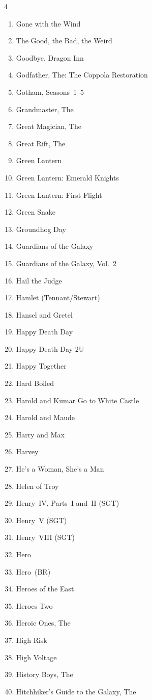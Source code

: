 \documentclass{article}
\begin{document}
\begin{multicols}{4}
\begin{enumerate}
\item Gone with the Wind
\item The Good, the Bad, the Weird
\item Goodbye, Dragon Inn
\item Godfather, The: The Coppola Restoration
\item Gotham, Seasons~1--5
\item Grandmaster, The
\item Great Magician, The
\item Great Rift, The
\item Green Lantern
\item Green Lantern: Emerald Knights
\item Green Lantern: First Flight
\item Green Snake
\item Groundhog Day
\item Guardians of the Galaxy
\item Guardians of the Galaxy, Vol.~2
\item Hail the Judge
\item Hamlet (Tennant/Stewart)
\item Hansel and Gretel
\item Happy Death Day
\item Happy Death Day 2U
\item Happy Together
\item Hard Boiled
\item Harold and Kumar Go to White Castle
\item Harold and Maude
\item Harry and Max
\item Harvey
\item He's a Woman, She's a Man
\item Helen of Troy
\item Henry~IV, Parts~I and~II (SGT)
\item Henry~V (SGT)
\item Henry~VIII (SGT)
\item Hero
\item Hero~(BR)
\item Heroes of the East
\item Heroes Two
\item Heroic Ones, The
\item High Risk
\item High Voltage
\item History Boys, The
\item Hitchhiker's Guide to the Galaxy, The

\end{enumerate}
\end{multicols}
\end{document}
